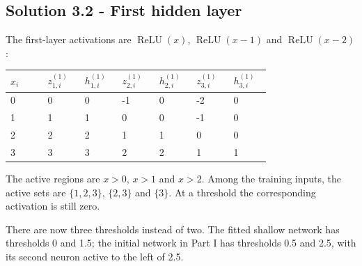 \documentclass{course_sheet}
\begin{document}
\begin{center}


\end{center}

\subsection{Solution 3.2 - First hidden layer}

The first-layer activations are $\operatorname{ReLU}(x)$,
$\operatorname{ReLU}(x-1)$ and $\operatorname{ReLU}(x-2)$:

\begin{center}

\begingroup
\setlength{\tabcolsep}{3pt}
\small
\begin{tabular}{@{}p{0.128\linewidth}p{0.128\linewidth}p{0.128\linewidth}p{0.128\linewidth}p{0.128\linewidth}p{0.128\linewidth}p{0.128\linewidth}@{}}
\toprule
$x_i$ & $z^{(1)}_{1,i}$ & $h^{(1)}_{1,i}$ & $z^{(1)}_{2,i}$ & $h^{(1)}_{2,i}$ & $z^{(1)}_{3,i}$ & $h^{(1)}_{3,i}$ \\
\midrule
0 & 0 & 0 & -1 & 0 & -2 & 0 \\
1 & 1 & 1 & 0 & 0 & -1 & 0 \\
2 & 2 & 2 & 1 & 1 & 0 & 0 \\
3 & 3 & 3 & 2 & 2 & 1 & 1 \\
\bottomrule
\end{tabular}
\endgroup

\end{center}

The active regions are $x>0$, $x>1$ and $x>2$. Among the training
inputs, the active sets are $\{1,2,3\}$, $\{2,3\}$ and $\{3\}$. At a
threshold the corresponding activation is still zero.

There are now three thresholds instead of two. The fitted shallow
network has thresholds 0 and 1.5; the initial network in Part I has
thresholds 0.5 and 2.5, with its second neuron active to the left of
2.5.
\end{document}
